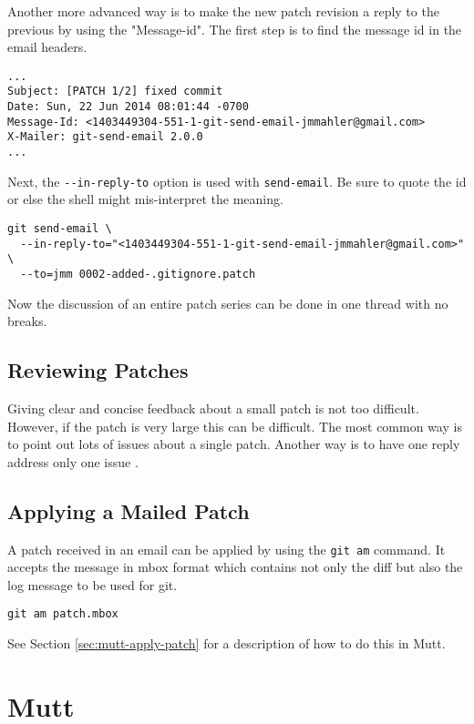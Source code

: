 \documentclass{article}
\begin{document}
Another more advanced way is to make the new patch revision a reply to the
previous by using the "Message-id".  The first step is to find the
message id in the email headers.

\begin{verbatim}
...
Subject: [PATCH 1/2] fixed commit
Date: Sun, 22 Jun 2014 08:01:44 -0700
Message-Id: <1403449304-551-1-git-send-email-jmmahler@gmail.com>
X-Mailer: git-send-email 2.0.0
...
\end{verbatim}

Next, the \verb+--in-reply-to+ option is used with \verb+send-email+.  Be sure to
quote the id or else the shell might mis-interpret the meaning.

\begin{verbatim}
git send-email \
  --in-reply-to="<1403449304-551-1-git-send-email-jmmahler@gmail.com>" \
  --to=jmm 0002-added-.gitignore.patch
\end{verbatim}

Now the discussion of an entire patch series can be done in one thread
with no breaks.

\subsection{Reviewing Patches}

Giving clear and concise feedback about a small patch is not too
difficult.  However, if the patch is very large this can be difficult.
The most common way is to point out lots of issues about a single patch.
Another way is to have one reply address only one issue \autocite{onereply}.

\subsection{Applying a Mailed Patch}

A patch received in an email can be applied by using the \verb+git am+ command.
It accepts the message in mbox format which contains not only the diff
but also the log message to be used for git.

\begin{verbatim}
git am patch.mbox
\end{verbatim}

See Section \ref{sec:mutt-apply-patch} for a description of how to do
this in Mutt.

\section{Mutt}
\end{document}
